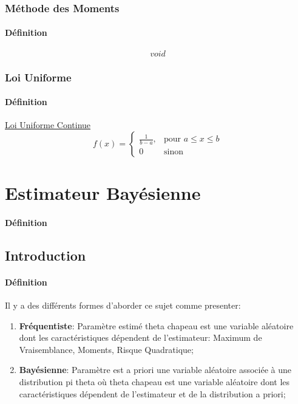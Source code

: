 \documentclass{article}
\begin{document}
\subsubsection{Méthode des Moments}
\paragraph{Définition}
\begin{equation}
    \boxed{
        void
    }
\end{equation}

\subsubsection{Loi Uniforme}
\paragraph{Définition} \href{https://fr.wikipedia.org/wiki/Loi_uniforme_continue}{Loi Uniforme Continue}
\begin{equation}
    \boxed{
        f(x) = 
        \begin{cases}
            \frac{1}{b-a},  & \text{pour } a \leq x \leq b\\
            0               & \text{sinon}    
        \end{cases}
    }
\end{equation}


\section{Estimateur Bayésienne}
\paragraph{Définition}

\subsection{Introduction}
\paragraph{Définition}Il y a des différents formes d'aborder ce sujet comme presenter:
\begin{enumerate}
    \item \textbf{Fréquentiste}: Paramètre estimé theta chapeau est une variable aléatoire dont les caractéristiques dépendent de l'estimateur: Maximum de Vraisemblance, Moments, Risque Quadratique;

    \item \textbf{Bayésienne}: Paramètre est a priori une variable aléatoire associée à une distribution pi theta où theta chapeau est une variable aléatoire dont les caractéristiques dépendent de l'estimateur et de la distribution a priori;
\end{enumerate}
\end{document}
